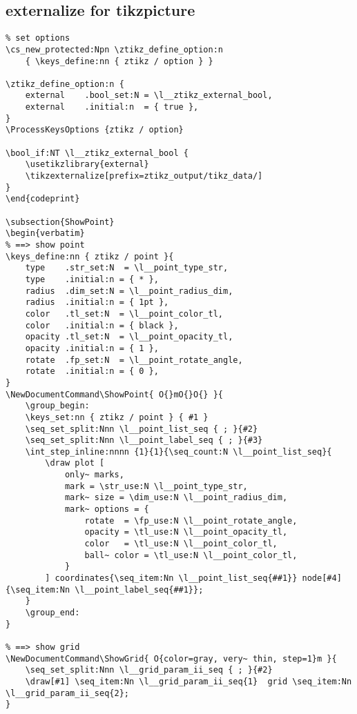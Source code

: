 \subsection{externalize for tikzpicture}
\begin{verbatim}
% set options
\cs_new_protected:Npn \ztikz_define_option:n
    { \keys_define:nn { ztikz / option } }

\ztikz_define_option:n {
    external    .bool_set:N = \l__ztikz_external_bool,
    external    .initial:n  = { true },
}
\ProcessKeysOptions {ztikz / option}

\bool_if:NT \l__ztikz_external_bool {
    \usetikzlibrary{external}
    \tikzexternalize[prefix=ztikz_output/tikz_data/]
}
\end{codeprint}

\subsection{ShowPoint}
\begin{verbatim}
% ==> show point
\keys_define:nn { ztikz / point }{
    type    .str_set:N  = \l__point_type_str,
    type    .initial:n = { * },
    radius  .dim_set:N = \l__point_radius_dim,
    radius  .initial:n = { 1pt },
    color   .tl_set:N  = \l__point_color_tl, 
    color   .initial:n = { black },
    opacity .tl_set:N  = \l__point_opacity_tl, 
    opacity .initial:n = { 1 },
    rotate  .fp_set:N  = \l__point_rotate_angle,
    rotate  .initial:n = { 0 },  
}
\NewDocumentCommand\ShowPoint{ O{}mO{}O{} }{
    \group_begin:
    \keys_set:nn { ztikz / point } { #1 }
    \seq_set_split:Nnn \l__point_list_seq { ; }{#2}
    \seq_set_split:Nnn \l__point_label_seq { ; }{#3}
    \int_step_inline:nnnn {1}{1}{\seq_count:N \l__point_list_seq}{        
        \draw plot [
            only~ marks,
            mark = \str_use:N \l__point_type_str, 
            mark~ size = \dim_use:N \l__point_radius_dim,
            mark~ options = {
                rotate  = \fp_use:N \l__point_rotate_angle, 
                opacity = \tl_use:N \l__point_opacity_tl, 
                color   = \tl_use:N \l__point_color_tl,
                ball~ color = \tl_use:N \l__point_color_tl,
            }
        ] coordinates{\seq_item:Nn \l__point_list_seq{##1}} node[#4]{\seq_item:Nn \l__point_label_seq{##1}};
    }
    \group_end:
}

% ==> show grid
\NewDocumentCommand\ShowGrid{ O{color=gray, very~ thin, step=1}m }{
    \seq_set_split:Nnn \l__grid_param_ii_seq { ; }{#2}
    \draw[#1] \seq_item:Nn \l__grid_param_ii_seq{1}  grid \seq_item:Nn \l__grid_param_ii_seq{2};
}
\end{verbatim}

